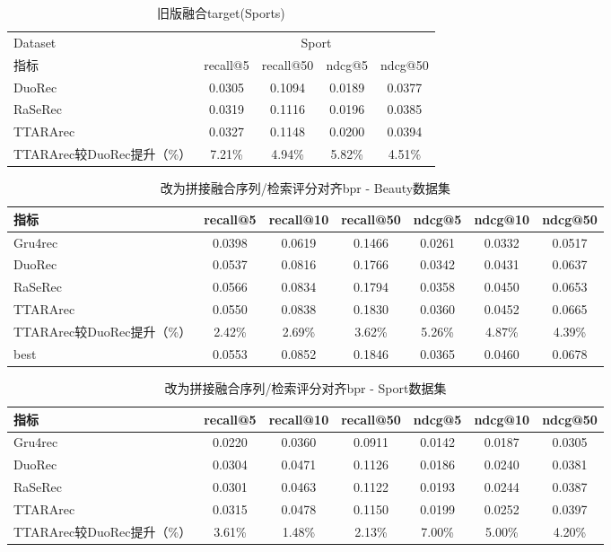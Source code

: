 \documentclass[12pt,a4paper]{article}
\begin{document}
\begin{CJK}{UTF8}{gbsn}
\begin{table}[H]
\centering
\caption{旧版融合target(Sports)}
\begin{tabular}{lcccc}
\toprule
\midrule
Dataset & \multicolumn{4}{c}{Sport} \\
指标 & recall@5 & recall@50 & ndcg@5 & ndcg@50 \\
DuoRec & 0.0305 & 0.1094 & 0.0189 & 0.0377 \\
RaSeRec & 0.0319 & 0.1116 & 0.0196 & 0.0385 \\
TTARArec & 0.0327 & 0.1148 & 0.0200 & 0.0394 \\
TTARArec较DuoRec提升（\%） & 7.21\% & 4.94\% & 5.82\% & 4.51\% \\
\bottomrule
\end{tabular}
\label{tab:sport_compare_metrics}
\end{table}

\begin{table}[H]
\centering
\caption{改为拼接融合序列/检索评分对齐bpr - Beauty数据集}
\begin{tabular}{lcccccc}
  \toprule
  指标 & recall@5 & recall@10 & recall@50 & ndcg@5 & ndcg@10 & ndcg@50 \\
  \midrule
  Gru4rec & 0.0398 & 0.0619 & 0.1466 & 0.0261 & 0.0332 & 0.0517 \\
  DuoRec & 0.0537 & 0.0816 & 0.1766 & 0.0342 & 0.0431 & 0.0637 \\
  RaSeRec & 0.0566 & 0.0834 & 0.1794 & 0.0358 & 0.0450 & 0.0653 \\
  TTARArec & 0.0550 & 0.0838 & 0.1830 & 0.0360 & 0.0452 & 0.0665 \\
  TTARArec较DuoRec提升（\%） & 2.42\% & 2.69\% & 3.62\% & 5.26\% & 4.87\% & 4.39\% \\
  best & 0.0553 & 0.0852 & 0.1846 & 0.0365 & 0.0460 & 0.0678 \\
  \bottomrule
\end{tabular}
\label{tab:beauty_concat_fusion_metrics}
\end{table}

\begin{table}[H]
  \centering
  \caption{改为拼接融合序列/检索评分对齐bpr - Sport数据集}
  \begin{tabular}{lcccccc}
    \toprule
    指标 & recall@5 & recall@10 & recall@50 & ndcg@5 & ndcg@10 & ndcg@50 \\
    \midrule
    Gru4rec & 0.0220 & 0.0360 & 0.0911 & 0.0142 & 0.0187 & 0.0305 \\
    DuoRec & 0.0304 & 0.0471 & 0.1126 & 0.0186 & 0.0240 & 0.0381 \\
    RaSeRec & 0.0301 & 0.0463 & 0.1122 & 0.0193 & 0.0244 & 0.0387 \\
    TTARArec & 0.0315 & 0.0478 & 0.1150 & 0.0199 & 0.0252 & 0.0397 \\
    TTARArec较DuoRec提升（\%） & 3.61\% & 1.48\% & 2.13\% & 7.00\% & 5.00\% & 4.20\% \\
    \bottomrule
  \end{tabular}
  \label{tab:sport_concat_fusion_metrics}
  \end{table}


\end{CJK}
\end{document}
